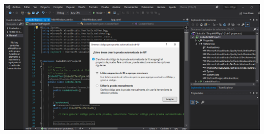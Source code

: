 \begin{itemize}
\begin{center}
\includegraphics[width=\columnwidth]{images/8}\newline
\end{center}
\end{itemize}